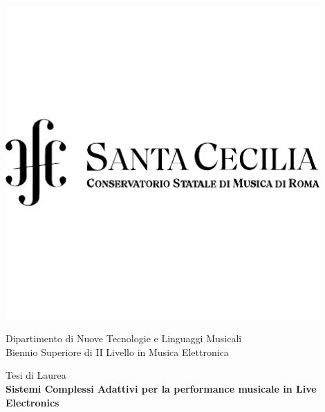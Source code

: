 
\begin{center}

\includegraphics[width=12cm]{figures/logo-CSC-pdf-cropped.pdf} \\
\vspace{1cm}

{\Large {Dipartimento di Nuove Tecnologie e Linguaggi
Musicali}} \\ 


{\Large {Biennio Superiore di II Livello in Musica Elettronica}} \\
\vspace{1cm}

{\Large {Tesi di Laurea}} \\[0.5cm]

{\LARGE \textbf{Sistemi Complessi Adattivi per la performance musicale in Live Electronics}} \\ 
\vspace{1cm}

\end{center}

